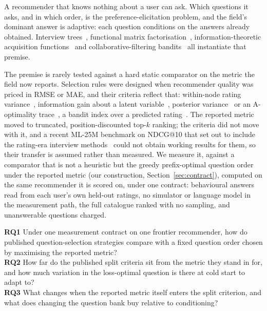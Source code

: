 \documentclass[runningheads]{llncs}
\begin{document}
A recommender that knows nothing about a user can ask. Which questions it asks, and in which order,
is the preference-elicitation problem, and the field's dominant answer is adaptive: each question
conditions on the answers already obtained. Interview
trees~\cite{golbandi2011adaptive,hu2013interview}, functional matrix
factorisation~\cite{zhou2011functional}, information-theoretic acquisition
functions~\cite{ma2019eddi,houlsby2011bald} and collaborative-filtering
bandits~\cite{zhao2013interactive,zhang2020conucb,wang2023conlinucb,liu2025clisk} all instantiate
that premise.

The premise is rarely tested against a hard static comparator on the metric the field now reports.
Selection rules were designed when recommender quality was priced in RMSE or MAE, and their criteria
reflect that: within-node rating variance~\cite{golbandi2011adaptive}, information gain about a
latent variable~\cite{ma2019eddi}, posterior variance~\cite{houlsby2011bald} or an A-optimality
trace~\cite{anava2015budget,sepliarskaia2018spq}, a bandit index over a predicted
rating~\cite{zhao2013interactive,zhang2020conucb}. The reported metric moved to truncated,
position-discounted top-$k$ ranking; the criteria did not move with it, and a recent ML-25M benchmark
on NDCG@10 that set out to include the rating-era interview methods~\cite{proissl2024greedyslim} could
not obtain working results for them, so their transfer is assumed rather than measured. We measure
it, against a comparator that is not a heuristic but the greedy prefix-optimal question order under
the reported metric (our construction, Section~\ref{sec:contract}), computed on the same recommender it is scored on, under one contract:
behavioural answers read from each user's own held-out ratings, no simulator or language model in the
measurement path, the full catalogue ranked with no sampling, and unanswerable questions charged.

\medskip
\noindent
\textbf{RQ1} Under one measurement contract on one frontier recommender, how do published
question-selection strategies compare with a fixed question order chosen by maximising the reported
metric?\\
\textbf{RQ2} How far do the published split criteria sit from the metric they stand in for, and how
much variation in the loss-optimal question is there at cold start to adapt to?\\
\textbf{RQ3} What changes when the reported metric itself enters the split criterion, and what does
changing the question bank buy relative to conditioning?
\medskip
\end{document}
